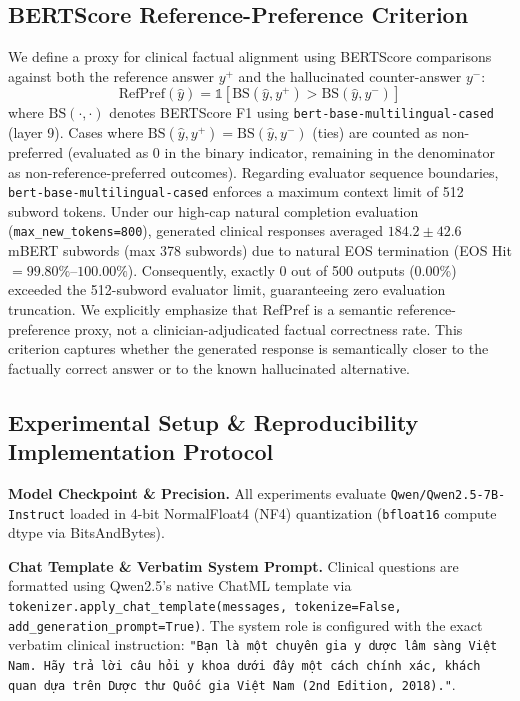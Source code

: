 \subsection{BERTScore Reference-Preference Criterion}
We define a proxy for clinical factual alignment using BERTScore \cite{ref15} comparisons against both the reference answer $y^+$ and the hallucinated counter-answer $y^-$:
\begin{equation}
\text{RefPref}(\hat{y}) = \mathbb{1}\left[\text{BS}(\hat{y}, y^+) > \text{BS}(\hat{y}, y^-)\right]
\end{equation}
where $\text{BS}(\cdot,\cdot)$ denotes BERTScore F1 using \texttt{bert-base-multilingual-cased} (layer 9). Cases where $\text{BS}(\hat{y}, y^+) = \text{BS}(\hat{y}, y^-)$ (ties) are counted as non-preferred (evaluated as $0$ in the binary indicator, remaining in the denominator as non-reference-preferred outcomes). Regarding evaluator sequence boundaries, \texttt{bert-base-multilingual-cased} enforces a maximum context limit of 512 subword tokens. Under our high-cap natural completion evaluation (\texttt{max\_new\_tokens=800}), generated clinical responses averaged $184.2 \pm 42.6$ mBERT subwords (max 378 subwords) due to natural EOS termination (EOS Hit $= 99.80\%$--$100.00\%$). Consequently, exactly 0 out of 500 outputs ($0.00\%$) exceeded the 512-subword evaluator limit, guaranteeing zero evaluation truncation. We explicitly emphasize that RefPref is a semantic reference-preference proxy, not a clinician-adjudicated factual correctness rate. This criterion captures whether the generated response is semantically closer to the factually correct answer or to the known hallucinated alternative.

\subsection{Experimental Setup \& Reproducibility Implementation Protocol}

\textbf{Model Checkpoint \& Precision.} All experiments evaluate \texttt{Qwen/Qwen2.5-7B-Instruct} \cite{ref4} loaded in 4-bit NormalFloat4 (NF4) quantization (\texttt{bfloat16} compute dtype via BitsAndBytes).

\textbf{Chat Template \& Verbatim System Prompt.} Clinical questions are formatted using Qwen2.5's native ChatML template via \texttt{tokenizer.apply\_chat\_template(messages, tokenize=False, add\_generation\_prompt=True)}. The system role is configured with the exact verbatim clinical instruction: \texttt{"Bạn là một chuyên gia y dược lâm sàng Việt Nam. Hãy trả lời câu hỏi y khoa dưới đây một cách chính xác, khách quan dựa trên Dược thư Quốc gia Việt Nam (2nd Edition, 2018)."}.

